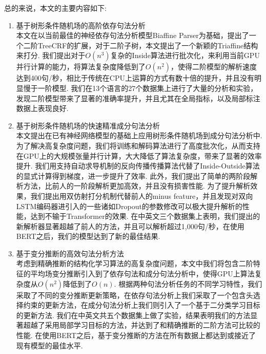总的来说，本文的主要内容如下:
\begin{enumerate}
  \item 基于树形条件随机场的高阶依存句法分析\\
        \indent 本文在以当前最佳的神经依存句法分析模型Biaffine Parser为基础，提出了一个二阶TreeCRF的扩展，对于二阶子树，本文提出了一个新颖的Triaffine结构来打分.
        我们提出对于$O(n^3)$复杂的Inside算法进行批次化，来利用当前GPU并行计算的能力，将算法复杂度降低到了$O(n^2)$，使得二阶模型的解析速度达到400句/秒，相比于传统在CPU上运算的方式有数十倍的提升，并且没有明显慢于一阶模型.
        我们在13个语言的27个数据集上进行了大量的分析和实验，发现二阶模型带来了显著的准确率提升，并且尤其在全局指标，以及局部标注数据上表现良好.
  \item 基于树形条件随机场的快速精准成分句法分析\\
        \indent 本文提出在已有神经网络模型的基础上应用树形条件随机场到成分句法分析中.
        为了解决高复杂度问题，我们将训练和解码算法进行了高度批次化，从而支持在GPU上的大规模张量并行计算，大大降低了算法复杂度，带来了显著的效率提升.
        我们用支持自动求导机制的反向传播传播算法代替了Inside-Outside算法的显式计算得到梯度，进一步提升了效率.
        此外，我们提出了简单的两阶段解析方法，比前人的一阶段解析更加高效，并且没有损害性能.
        为了提升解析效果，我们提出用双仿射打分机制代替前人的minus feature，并且发现对双向LSTM编码器进引入的一些诸如Dropout的参数修改可以极大提升解析的性能，达到不输于Transformer的效果.
        在中英文三个数据集上表明，我们提出的新解析器显著超越了前人的方法，并且可以解析超过1,000句/秒，在使用BERT之后，我们的模型达到了新的最佳结果.
  \item 基于变分推断的高效句法分析方法\\
        \indent 考虑到精确推断的结构化学习算法的高复杂度问题，本文中我们将包含二阶特征的平均场变分推断引入到了依存句法和成分句法分析中，使得GPU上算法复杂度从$O(n^2)$降低到了$O(n)$.
        根据两种句法分析任务的不同学习特性，我们采取了不同的变分推断更新策略，在依存句法分析上我们采取了一个包含头选择约束的更新方法，在成分句法分析上我们则引入了一个基于二分类学习目标的更新方法.
        我们在中英文共五个数据集上做了实验，结果表明我们的方法显著超越了采用局部学习目标的方法，并达到了和精确推断的二阶方法可比较的性能.
        在使用BERT之后，基于变分推断的方法在所有数据上都达到或接近了现有模型的最佳水平.
\end{enumerate}

